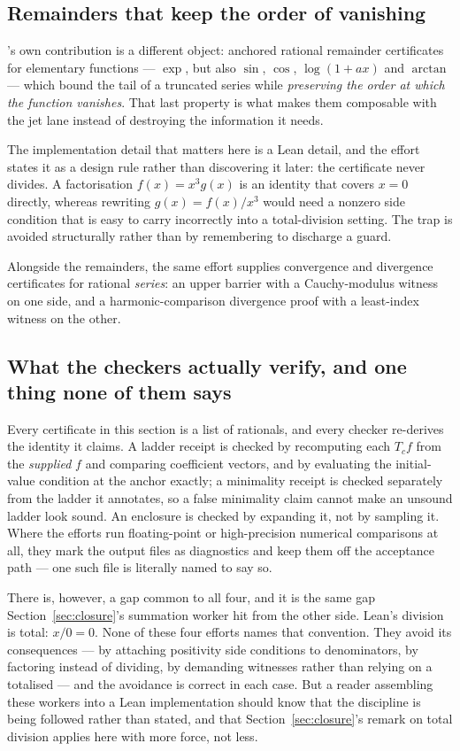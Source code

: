\subsection{Remainders that keep the order of vanishing}

's own contribution is a different object: anchored rational remainder
certificates for elementary functions --- $\exp$, but also $\sin$, $\cos$,
$\log(1+ax)$ and $\arctan$ --- which bound the tail of a truncated series while
\emph{preserving the order at which the function vanishes}. That last property
is what makes them composable with the jet lane instead of destroying the
information it needs.

The implementation detail that matters here is a Lean detail, and the effort
states it as a design rule rather than discovering it later: the certificate
never divides. A factorisation $f(x)=x^3g(x)$ is an identity that covers $x=0$
directly, whereas rewriting $g(x)=f(x)/x^3$ would need a nonzero side condition
that is easy to carry incorrectly into a total-division setting. The trap is
avoided structurally rather than by remembering to discharge a guard.

Alongside the remainders, the same effort supplies convergence and divergence
certificates for rational \emph{series}: an upper barrier with a Cauchy-modulus
witness on one side, and a harmonic-comparison divergence proof with a
least-index witness on the other.

\subsection{What the checkers actually verify, and one thing none of them says}

Every certificate in this section is a list of rationals, and every checker
re-derives the identity it claims. A ladder receipt is checked by recomputing
each $T_cf$ from the \emph{supplied} $f$ and comparing coefficient vectors, and
by evaluating the initial-value condition at the anchor exactly; a minimality
receipt is checked separately from the ladder it annotates, so a false
minimality claim cannot make an unsound ladder look sound. An enclosure is
checked by expanding it, not by sampling it. Where the efforts run
floating-point or high-precision numerical comparisons at all, they mark the
output files as diagnostics and keep them off the acceptance path --- one such
file is literally named to say so.

There is, however, a gap common to all four, and it is the same gap
Section~\ref{sec:closure}'s summation worker hit from the other side. Lean's
division is total: $x/0=0$. None of these four efforts names that convention.
They avoid its consequences --- by attaching positivity side conditions to
denominators, by factoring instead of dividing, by demanding 
witnesses rather than relying on a totalised  --- and the avoidance
is correct in each case. But a reader assembling these workers into a Lean
implementation should know that the discipline is being followed rather than
stated, and that Section~\ref{sec:closure}'s remark on total division applies
here with more force, not less.
